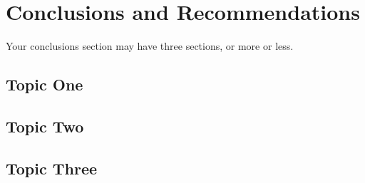 \chapter{Conclusions and Recommendations}
\label{cha:Conclusions}      %

Your conclusions section may have three sections, or more or less.

\section{Topic One}
\lipsum
\section{Topic Two}
\lipsum
\section{Topic Three}
\lipsum